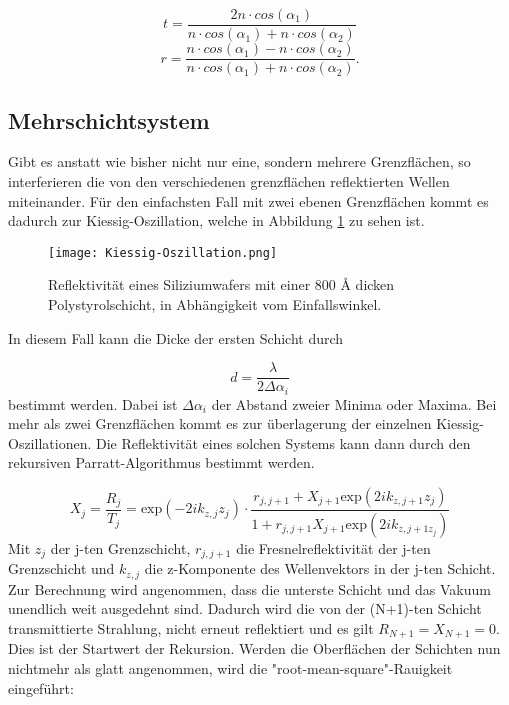\begin{equation}
    t = \frac{2 n \cdot cos(\alpha_1)}{n \cdot cos(\alpha_1) + n \cdot cos(\alpha_2)}
\end{equation}
\begin{equation}
    r = \frac{n \cdot cos(\alpha_1) - n \cdot cos(\alpha_2)}{n \cdot cos(\alpha_1) + n \cdot cos(\alpha_2)}.
\end{equation}


\subsection{Mehrschichtsystem}
Gibt es anstatt wie bisher nicht nur eine, sondern mehrere Grenzflächen, so interferieren die von den verschiedenen grenzflächen reflektierten Wellen miteinander.
Für den einfachsten Fall mit zwei ebenen Grenzflächen kommt es dadurch zur Kiessig-Oszillation, welche in Abbildung \ref{fig:Kiessig-Oszillation} zu sehen ist.

\begin{figure}
    \centering
    \texttt{[image: Kiessig-Oszillation.png]}
    \caption{Reflektivität eines Siliziumwafers mit einer 800 Å dicken Polystyrolschicht, in Abhängigkeit vom Einfallswinkel. \cite{Anleitungalt}}
    \label{fig:Kiessig-Oszillation}
\end{figure}

In diesem Fall kann die Dicke der ersten Schicht durch 

\begin{equation}
    d = \frac{\lambda}{2 \Delta \alpha_i}
\end{equation}
bestimmt werden. Dabei ist $\Delta \alpha_i$ der Abstand zweier Minima oder Maxima.
Bei mehr als zwei Grenzflächen kommt es zur überlagerung der einzelnen Kiessig-Oszillationen. 
Die Reflektivität eines solchen Systems kann dann durch den rekursiven Parratt-Algorithmus bestimmt werden.

\begin{equation}
    X_j = \frac{R_j}{T_j} = \text{exp}(-2i k_{z,j} z_j) \cdot \frac{r_{j,j+1} + X_{j+1} \text{exp}(2i k_{z,j+1} z_j) }{1 + r_{j,j+1} X_{j+1} \text{exp}(2i k_{z,j+1 z_j})}
\end{equation}
Mit $z_j$ der j-ten Grenzschicht, $r_{j,j+1}$ die Fresnelreflektivität der j-ten Grenzschicht und $k_{z,j}$ die z-Komponente des Wellenvektors in der j-ten Schicht.
Zur Berechnung wird angenommen, dass die unterste Schicht und das Vakuum unendlich weit ausgedehnt sind. Dadurch wird die von der (N+1)-ten Schicht transmittierte 
Strahlung, nicht erneut reflektiert und es gilt $R_{N+1} = X_{N+1} = 0$.
Dies ist der Startwert der Rekursion.
Werden die Oberflächen der Schichten nun nichtmehr als glatt angenommen, wird die "root-mean-square"-Rauigkeit eingeführt:

